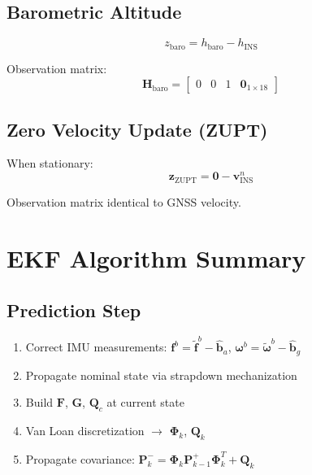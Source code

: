\documentclass[11pt,a4paper]{article}
\newcommand{\mat}[1]{\mathbf{#1}}
\newcommand{\vect}[1]{\boldsymbol{#1}}
\begin{document}
\subsection{Barometric Altitude}

\begin{equation}
    z_{\text{baro}} = h_{\text{baro}} - h_{\text{INS}}
\end{equation}

Observation matrix:
\begin{equation}
    \mat{H}_{\text{baro}} = \begin{bmatrix}
        0 & 0 & 1 & \mat{0}_{1\times18}
    \end{bmatrix}
\end{equation}

\subsection{Zero Velocity Update (ZUPT)}

When stationary:
\begin{equation}
    \mat{z}_{\text{ZUPT}} = \mat{0} - \mat{v}_{\text{INS}}^n
\end{equation}

Observation matrix identical to GNSS velocity.

\section{EKF Algorithm Summary}

\subsection{Prediction Step}

\begin{enumerate}
    \item Correct IMU measurements: $\mat{f}^b = \tilde{\mat{f}}^b - \hat{\mat{b}}_a$, $\vect{\omega}^b = \tilde{\vect{\omega}}^b - \hat{\mat{b}}_g$
    \item Propagate nominal state via strapdown mechanization
    \item Build $\mat{F}$, $\mat{G}$, $\mat{Q}_c$ at current state
    \item Van Loan discretization $\rightarrow$ $\vect{\Phi}_k$, $\mat{Q}_k$
    \item Propagate covariance: $\mat{P}_k^- = \vect{\Phi}_k \mat{P}_{k-1}^+ \vect{\Phi}_k^T + \mat{Q}_k$
\end{enumerate}
\end{document}
